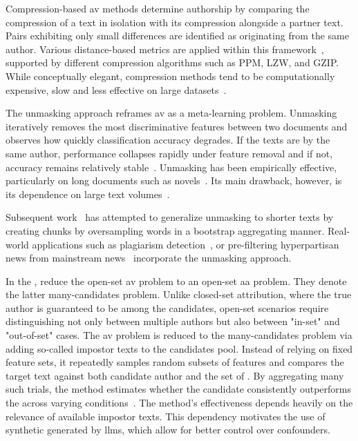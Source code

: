Compression-based \ac{av} methods determine authorship by comparing the compression of a text in isolation with its compression alongside a partner text. 
Pairs exhibiting only small differences are identified as originating from the same author.
Various distance-based metrics are applied within this framework~\citep{elmanarelbouanani_authorship_2014,bevendorff_divergence_based_2020,bevendorff_overview_2024}, supported by different compression algorithms such as PPM, LZW, and GZIP. 
While conceptually elegant, compression methods tend to be computationally expensive, slow and less effective on large datasets~\citep{tyo_state_2022,neal_surveying_2018}. 

The unmasking approach reframes \ac{av} as a meta-learning problem. 
Unmasking iteratively removes the most discriminative features between two documents and observes how quickly classification accuracy degrades. 
If the texts are by the same author, performance collapses rapidly under feature removal and if not, accuracy remains relatively stable~\citep{koppel_authorship_2004}. 
Unmasking has been empirically effective, particularly on long documents such as novels~\citep{koppel_authorship_2011}. 
Its main drawback, however, is its dependence on large text volumes~\citep{koppel_determining_2014,bevendorff_generalizing_2019}.

Subsequent work~\citep{bevendorff_generalizing_2019,bevendorff_divergence_based_2020} has attempted to generalize unmasking to shorter texts by creating chunks by oversampling words in a bootstrap aggregating manner. 
Real-world applications such as plagiarism detection~\citep{stein_intrinsic_2011}, or pre-filtering hyperpartisan news from mainstream news~\citep{potthast_stylometric_2018} incorporate the unmasking approach.


In the \impAppr{}, \citet{koppel_determining_2014} reduce the open-set \ac{av} problem to an open-set \ac{aa} problem.
They denote the latter many-candidates problem. 
Unlike closed-set attribution, where the true author is guaranteed to be among the candidates, open-set scenarios require distinguishing not only between multiple authors but also between "in-set" and "out-of-set" cases. 
The \ac{av} problem is reduced to the many-candidates problem via adding so-called impostor texts to the candidates pool. 
Instead of relying on fixed feature sets, it repeatedly samples random subsets of features and compares the target text against both candidate author and the set of \imps{}. 
By aggregating many such trials, the method estimates whether the candidate consistently outperforms the \imps{} across varying conditions~\citep{koppel_determining_2014}. 
The method's effectiveness depends heavily on the relevance of available impostor texts. 
This dependency motivates the use of synthetic \imps{} generated by \acp{llm}, which allow for better control over confounders.

